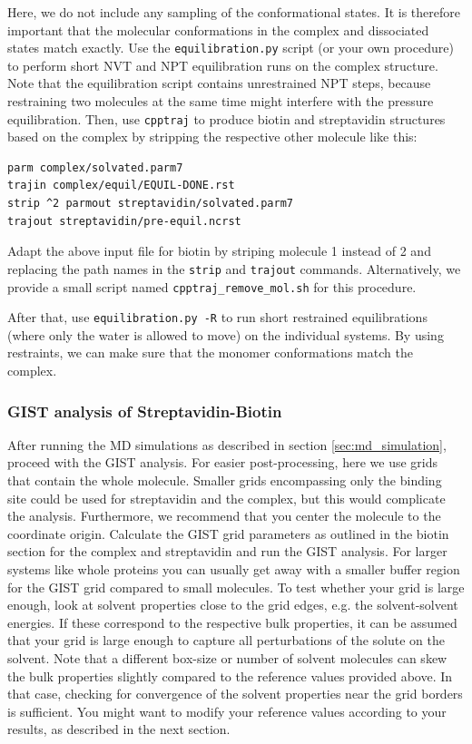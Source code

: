 \documentclass[9pt,tutorial]{livecoms}
\newcommand{\software}{\texttt}
\newcommand\inlinecode{\texttt}
\begin{document}
Here, we do not include any sampling of the conformational states.
It is therefore important that the molecular conformations in the complex and dissociated states match exactly.
Use the \software{equilibration.py} script (or your own procedure) to perform short NVT and NPT equilibration runs on the complex structure.
Note that the equilibration script contains unrestrained NPT steps, because restraining two molecules at the same time might interfere with the pressure equilibration.
Then, use \software{cpptraj} to produce biotin and streptavidin structures based on the complex by stripping the respective other molecule like this:
\begin{lstlisting}[style=cpptraj]
parm complex/solvated.parm7
trajin complex/equil/EQUIL-DONE.rst
strip ^2 parmout streptavidin/solvated.parm7
trajout streptavidin/pre-equil.ncrst
\end{lstlisting}
Adapt the above input file for biotin by striping molecule 1 instead of 2 and replacing the path names in the \inlinecode{strip} and  \inlinecode{trajout} commands.
Alternatively, we provide a small script named \software{cpptraj\_remove\_mol.sh} for this procedure.

After that, use \software{equilibration.py -R} to run short restrained 
equilibrations (where only the water is allowed to move) on the individual 
systems.
By using restraints, we can make sure that the monomer conformations match the complex.

\subsubsection{GIST analysis of Streptavidin-Biotin}
After running the MD simulations as described in section \ref{sec:md_simulation}, proceed with the GIST analysis.
For easier post-processing, here we use grids that contain the whole molecule.
Smaller grids encompassing only the binding site could be used for streptavidin and the complex, but this would complicate the analysis.
Furthermore, we recommend that you center the molecule to the coordinate origin.
Calculate the GIST grid parameters as outlined in the biotin section for the complex and streptavidin and run the GIST analysis.
For larger systems like whole proteins you can usually get away with a smaller buffer region for the GIST grid compared to small molecules.
To test whether your grid is large enough, look at solvent properties close to the grid edges, e.g. the solvent-solvent energies.
If these correspond to the respective bulk properties, it can be assumed that your grid is large enough to capture all perturbations of the solute on the solvent.
Note that a different box-size or number of solvent molecules can skew the bulk properties slightly compared to the reference values provided above.
In that case, checking for convergence of the solvent properties near the grid borders is sufficient. You might want to modify your reference values according to your results, as described in the next section.
\end{document}
